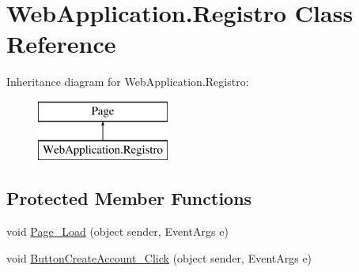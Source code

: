 \hypertarget{classWebApplication_1_1Registro}{}\section{Web\+Application.\+Registro Class Reference}
\label{classWebApplication_1_1Registro}
Inheritance diagram for Web\+Application.\+Registro\+:\begin{figure}[H]
\begin{center}
\leavevmode
\includegraphics[height=2.000000cm]{dd/d59/classWebApplication_1_1Registro}
\end{center}
\end{figure}
\subsection*{Protected Member Functions}
\begin{DoxyCompactItemize}
\item 
void \mbox{\hyperlink{classWebApplication_1_1Registro_a78c6a12b73bcc3a6b4c4a2fee7cf0698}{Page\+\_\+\+Load}} (object sender, Event\+Args e)
\item 
void \mbox{\hyperlink{classWebApplication_1_1Registro_a7189efc9ef450f0288049e1089719b86}{Button\+Create\+Account\+\_\+\+Click}} (object sender, Event\+Args e)
\end{DoxyCompactItemize}

